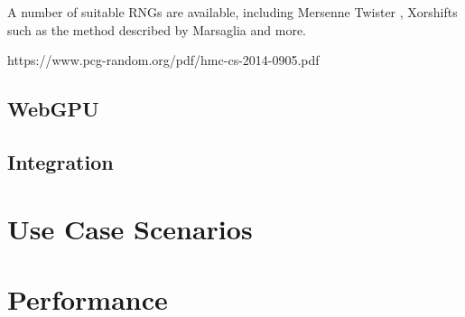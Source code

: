 A number of suitable RNGs are available, including Mersenne Twister \cite{rngMersenneTwister}, Xorshifts such as the method described by Marsaglia \cite{marsaglia2003xorshift} and more.

https://www.pcg-random.org/pdf/hmc-cs-2014-0905.pdf

\subsection{WebGPU}
\subsection{Integration}
\section{Use Case Scenarios}
\section{Performance}